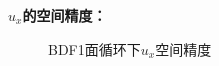 \documentclass[a4paper,11pt,UTF8]{article}%
\theoremstyle{plain}
\begin{document}
\indent \textbf{$u_x$的空间精度：}
\begin{figure}[!h]
	\centering
	
	
	\caption{BDF1面循环下$u_x$空间精度}
\end{figure}

	\clearpage
\end{document}
